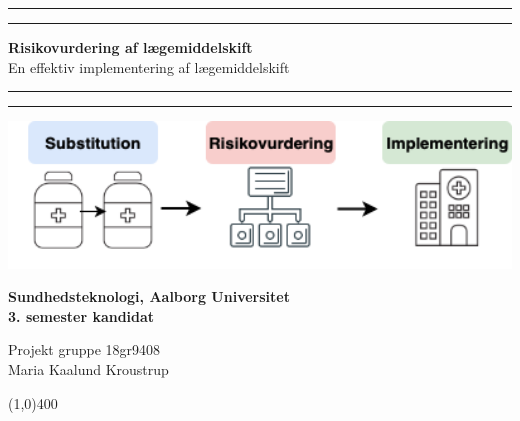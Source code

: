 \clearpage
\thispagestyle{empty}


\begin{center}	
	\rule{\textwidth}{1.6pt}\vspace*{-\baselineskip}\vspace*{2pt} %
	\rule{\textwidth}{0.4pt} %
	
	\vspace{1.2\baselineskip} %
	
	{\Huge \textbf{Risikovurdering af lægemiddelskift}} \\ \vspace{3mm}%
	{\LARGE En effektiv implementering af lægemiddelskift}
	\vspace{1\baselineskip} %
	
	\rule{\textwidth}{0.4pt}\vspace*{-\baselineskip}\vspace{3.2pt} %
	\rule{\textwidth}{1.6pt} %
	
	\vspace{7\baselineskip} %
		\includegraphics[width=1\textwidth]{billeder/forside.png} \\
		\vspace{5cm}
	 		\begin{Large}
	 		\textbf{Sundhedsteknologi, Aalborg Universitet  \\ 3. semester kandidat}\\
		\vspace{1cm}
			\end{Large}
	{\Large Projekt gruppe 18gr9408 \\
	Maria Kaalund Kroustrup}
\end{center}
\vspace*{\fill}

\begin{center}
	\line(1,0){400}
\end{center}



